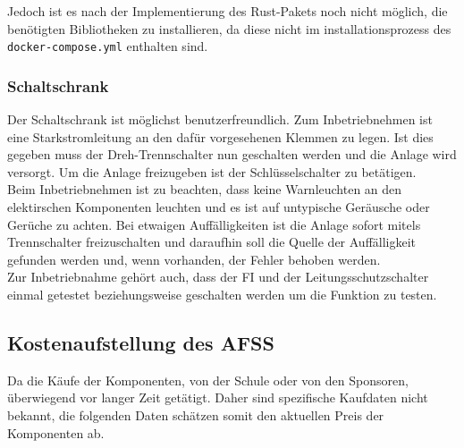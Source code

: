 Jedoch ist es nach der Implementierung des Rust-Pakets noch nicht möglich, die benötigten Bibliotheken zu installieren, da diese nicht im installationsprozess des \texttt{docker-compose.yml} enthalten sind. 


\subsubsection{Schaltschrank}
    Der Schaltschrank ist möglichst benutzerfreundlich. Zum Inbetriebnehmen ist eine Starkstromleitung an den dafür vorgesehenen Klemmen zu legen. Ist dies gegeben muss der Dreh-Trennschalter nun geschalten werden und die Anlage wird versorgt. Um die Anlage freizugeben ist der Schlüsselschalter zu betätigen.\\
    Beim Inbetriebnehmen ist zu beachten, dass keine Warnleuchten an den elektirschen Komponenten leuchten und es ist auf untypische Geräusche oder Gerüche zu achten. Bei etwaigen Auffälligkeiten ist die Anlage sofort mitels Trennschalter freizuschalten und daraufhin soll die Quelle der Auffälligkeit gefunden werden und, wenn vorhanden, der Fehler behoben werden.\\
    Zur Inbetriebnahme gehört auch, dass der FI und der Leitungsschutzschalter einmal getestet beziehungsweise geschalten werden um die Funktion zu testen.\\

\newpage

\subsection{Kostenaufstellung des AFSS}
Da die Käufe der Komponenten, von der Schule oder von den Sponsoren, überwiegend vor langer Zeit getätigt. Daher sind spezifische Kaufdaten nicht bekannt, die folgenden Daten schätzen somit den aktuellen Preis der Komponenten ab. 

